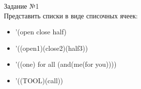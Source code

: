 {\LARGE Задание №1}\\

Представить списки в виде списочных ячеек:
\begin{itemize}
\item '(open close half)
\begin{figure}[ht!]
\end{figure}
\item '((open1)(close2)(half3))
\begin{figure}[ht!]
\end{figure}
\newpage
\item '((one) for all (and(me(for you))))
\begin{figure}[ht!]
\end{figure}
\item '((TOOL)(call))
\begin{figure}[ht!]

\end{figure}
\end{itemize}
